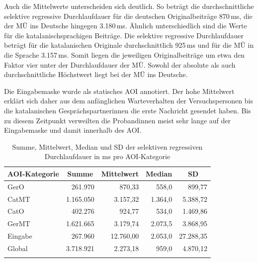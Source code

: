 \begin{sloppypar}
Auch die Mittelwerte unterscheiden sich deutlich. So beträgt die durchschnittliche selektive regressive Durchlaufdauer für die deutschen Originalbeiträge 870\,ms, die der MÜ ins Deutsche hingegen 3.180\,ms. Ähnlich unterschiedlich sind die Werte für die katalanischsprachigen Beiträge. Die selektive regressive Durchlaufdauer beträgt für die katalanischen Originale durchschnittlich 925\,ms und für die MÜ in die Sprache 3.157\,ms. Somit liegen die jeweiligen Originalbeiträge um etwa den Faktor vier unter der Durchlaufdauer der MÜ. Sowohl der absolute als auch durchschnittliche Höchstwert liegt bei der MÜ ins Deutsche.
\end{sloppypar}

Die Eingabemaske wurde als statisches AOI annotiert. Der hohe Mittelwert erklärt sich daher aus dem anfänglichen Warteverhalten der Versuchspersonen bis die katalanischen Gesprächspartner{\textperiodcentered}innen die erste Nachricht gesendet haben. Bis zu diesem Zeitpunkt verweilten die Proband{\textperiodcentered}innen meist sehr lange auf der Eingabemaske und damit innerhalb des AOI.


	\begin{table}
		\begin{tabular}{lrrrr}  
		\lsptoprule
			{AOI-Kategorie} & \multicolumn{1}{c}{Summe} & \multicolumn{1}{c}{Mittelwert} & \multicolumn{1}{c}{Median} & \multicolumn{1}{c}{SD} \\ 
			\midrule
			GerO   & 261.970 & 870,33 & 558,0 & 899,77 \\ 
			CatMT   & 1.165.050 & 3.157,32 & 1.364,0 & 5.388,72 \\ 
			CatO 	& 402.276 & 924,77 & 534,0 & 1.469,86 \\ 
			GerMT	& 1.621.665 & 3.179,74 & 2.073,5 & 3.868,95 \\ 
            Eingabe   & 267.960 & 12.760,00 & 2.053,0  & 27.288,35 \\ 
            \midrule
			Global  & 3.718.921 & 2.273,18 & 959,0 & 4.870,12 \\ 
			\lspbottomrule
		\end{tabular}
			\caption[Summe, Mittelwert, Median und SD der selektiven regressiven Durchlaufdauer]{Summe, Mittelwert, Median und SD der selektiven regressiven Durchlaufdauer in ms pro AOI-Kategorie\label{K6:tab:CatDe:mean-sd-iaselregpd}}
	\end{table}
	


